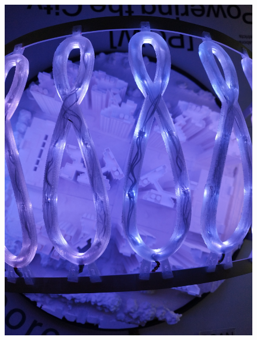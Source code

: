 \documentclass[a4paper,9pt]{article}
\begin{document}
\begin{minipage}{0.48\linewidth}
         \begin{figure}[H]
        \centering
        \includegraphics[width=.9\linewidth, angle =180]{Images/e1.jpg}

    \end{figure}
    \end{minipage}
    \hfill
\end{document}
